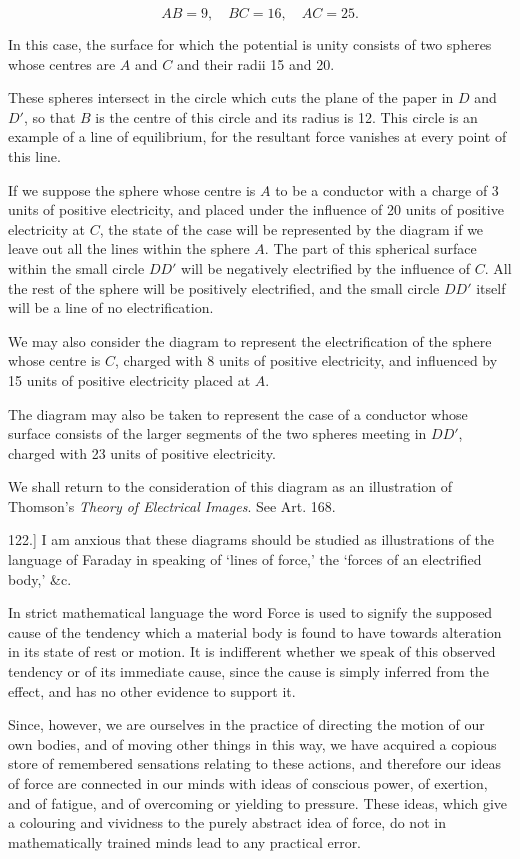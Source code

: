 \documentclass[11pt,a4paper]{article}
\begin{document}
\[
AB=9,\quad BC=16,\quad AC=25.
\]

In this case, the surface for which the potential is unity consists of two spheres whose centres are $A$ and $C$ and their radii 15 and 20.

These spheres intersect in the circle which cuts the plane of the paper in $D$ and $D'$, so that $B$ is the centre of this circle and its radius is 12. This circle is an example of a line of equilibrium, for the resultant force vanishes at every point of this line.

If we suppose the sphere whose centre is $A$ to be a conductor with a charge of 3 units of positive electricity, and placed under the influence of 20 units of positive electricity at $C$, the state of the case will be represented by the diagram if we leave out all the lines within the sphere $A$. The part of this spherical surface within the small circle $DD'$ will be negatively electrified by the influence of $C$. All the rest of the sphere will be positively electrified, and the small circle $DD'$ itself will be a line of no electrification.

We may also consider the diagram to represent the electrification of the sphere whose centre is $C$, charged with 8 units of positive electricity, and influenced by 15 units of positive electricity placed at $A$.

The diagram may also be taken to represent the case of a conductor whose surface consists of the larger segments of the two spheres meeting in $DD'$, charged with 23 units of positive electricity.

We shall return to the consideration of this diagram as an illustration of Thomson's \emph{Theory of Electrical Images}. See Art. 168.

122.] I am anxious that these diagrams should be studied as illustrations of the language of Faraday in speaking of `lines of force,' the `forces of an electrified body,' \&c.

In strict mathematical language the word Force is used to signify the supposed cause of the tendency which a material body is found to have towards alteration in its state of rest or motion. It is indifferent whether we speak of this observed tendency or of its immediate cause, since the cause is simply inferred from the effect, and has no other evidence to support it.

Since, however, we are ourselves in the practice of directing the motion of our own bodies, and of moving other things in this way, we have acquired a copious store of remembered sensations relating to these actions, and therefore our ideas of force are connected in our minds with ideas of conscious power, of exertion, and of fatigue, and of overcoming or yielding to pressure. These ideas, which give a colouring and vividness to the purely abstract idea of force, do not in mathematically trained minds lead to any practical error.
\end{document}
